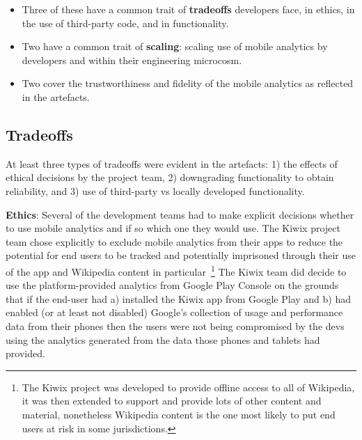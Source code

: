 \begin{itemize}
    \item Three of these have a common trait of \textbf{tradeoffs} developers face, in ethics, in the use of third-party code, and in functionality.
    \item Two have a common trait of \textbf{scaling}: scaling use of mobile analytics by developers and within their engineering microcosm.
    \item Two cover the trustworthiness and fidelity of the mobile analytics as reflected in the artefacts. 
\end{itemize}

\subsection{Tradeoffs}
At least three types of tradeoffs were evident in the artefacts: 1) the effects of ethical decisions by the project team, 2) downgrading functionality to obtain reliability, and 3) use of third-party vs locally developed functionality. 

\textbf{Ethics}: 
Several of the development teams had to make explicit decisions whether to use mobile analytics and if so which one they would use. The Kiwix project team chose explicitly to exclude mobile analytics from their apps to reduce the potential for end users to be tracked and potentially imprisoned through their use of the app and Wikipedia content in particular~\footnote{The Kiwix project was developed to provide offline access to all of Wikipedia, it was then extended to support and provide lots of other content and material, nonetheless Wikipedia content is the one most likely to put end users at risk in some jurisdictions.} The Kiwix team did decide to use the platform-provided analytics from Google Play Console on the grounds that if the end-user had a) installed the Kiwix app from Google Play and b) had enabled (or at least not disabled) Google's collection of usage and performance data from their phones then the users were not being compromised by the devs using the analytics generated from the data those phones and tablets had provided.

